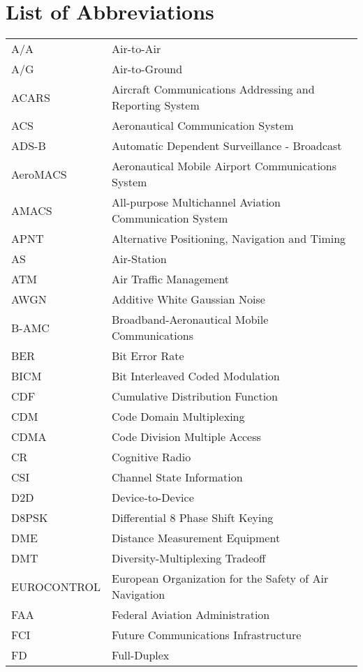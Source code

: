 \chapter* {List of Abbreviations}

\begin{longtable}{ll}		
A/A	& Air-to-Air\\
A/G	& Air-to-Ground \\
ACARS	& Aircraft Communications Addressing and Reporting System \\
ACS	& Aeronautical Communication System\\
ADS-B	& Automatic Dependent Surveillance - Broadcast\\
AeroMACS	& Aeronautical Mobile Airport Communications System\\
AMACS	& All-purpose Multichannel Aviation Communication System \\
APNT	& Alternative Positioning, Navigation and Timing\\
AS	& Air-Station\\
ATM	& Air Traffic Management\\
AWGN	& Additive White Gaussian Noise\\
B-AMC	& Broadband-Aeronautical Mobile Communications\\
BER	& Bit Error Rate\\
BICM	& Bit Interleaved Coded Modulation\\
CDF	& Cumulative Distribution Function\\
CDM	& Code Domain Multiplexing\\
CDMA	& Code Division Multiple Access\\
CR	& Cognitive Radio\\
CSI	& Channel State Information\\
D2D	& Device-to-Device\\
D8PSK	& Differential 8 Phase Shift Keying\\
DME	& Distance Measurement Equipment \\
DMT	& Diversity-Multiplexing Tradeoff\\
EUROCONTROL	& European Organization for the Safety of Air Navigation\\
FAA	& Federal Aviation Administration\\
FCI	& Future Communications Infrastructure\\
FD	& Full-Duplex\\

\end{longtable}
